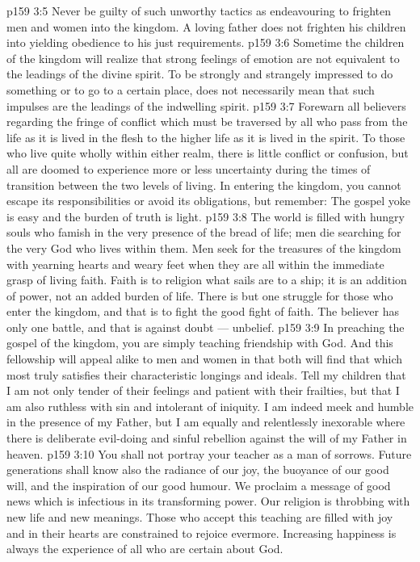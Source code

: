\vs p159 3:5 Never be guilty of such unworthy tactics as endeavouring to frighten men and women into the kingdom. A loving father does not frighten his children into yielding obedience to his just requirements.
\vs p159 3:6 Sometime the children of the kingdom will realize that strong feelings of emotion are not equivalent to the leadings of the divine spirit. To be strongly and strangely impressed to do something or to go to a certain place, does not necessarily mean that such impulses are the leadings of the indwelling spirit.
\vs p159 3:7 Forewarn all believers regarding the fringe of conflict which must be traversed by all who pass from the life as it is lived in the flesh to the higher life as it is lived in the spirit. To those who live quite wholly within either realm, there is little conflict or confusion, but all are doomed to experience more or less uncertainty during the times of transition between the two levels of living. In entering the kingdom, you cannot escape its responsibilities or avoid its obligations, but remember: The gospel yoke is easy and the burden of truth is light.
\vs p159 3:8 The world is filled with hungry souls who famish in the very presence of the bread of life; men die searching for the very God who lives within them. Men seek for the treasures of the kingdom with yearning hearts and weary feet when they are all within the immediate grasp of living faith. Faith is to religion what sails are to a ship; it is an addition of power, not an added burden of life. There is but one struggle for those who enter the kingdom, and that is to fight the good fight of faith. The believer has only one battle, and that is against doubt --- unbelief.
\vs p159 3:9 In preaching the gospel of the kingdom, you are simply teaching friendship with God. And this fellowship will appeal alike to men and women in that both will find that which most truly satisfies their characteristic longings and ideals. Tell my children that I am not only tender of their feelings and patient with their frailties, but that I am also ruthless with sin and intolerant of iniquity. I am indeed meek and humble in the presence of my Father, but I am equally and relentlessly inexorable where there is deliberate evil\hyp{}doing and sinful rebellion against the will of my Father in heaven.
\vs p159 3:10 You shall not portray your teacher as a man of sorrows. Future generations shall know also the radiance of our joy, the buoyance of our good will, and the inspiration of our good humour. We proclaim a message of good news which is infectious in its transforming power. Our religion is throbbing with new life and new meanings. Those who accept this teaching are filled with joy and in their hearts are constrained to rejoice evermore. Increasing happiness is always the experience of all who are certain about God.
